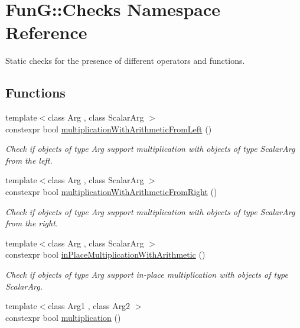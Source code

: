\hypertarget{namespaceFunG_1_1Checks}{}\section{Fun\+G\+:\+:Checks Namespace Reference}
\label{namespaceFunG_1_1Checks}


Static checks for the presence of different operators and functions.  


\subsection*{Functions}
\begin{DoxyCompactItemize}
\item 
{\footnotesize template$<$class Arg , class Scalar\+Arg $>$ }\\constexpr bool \hyperlink{namespaceFunG_1_1Checks_a023e0071a13fe19a14bd71df1a02a290}{multiplication\+With\+Arithmetic\+From\+Left} ()
\begin{DoxyCompactList}\small\item\em Check if objects of type Arg support multiplication with objects of type Scalar\+Arg from the left. \end{DoxyCompactList}\item 
{\footnotesize template$<$class Arg , class Scalar\+Arg $>$ }\\constexpr bool \hyperlink{namespaceFunG_1_1Checks_a584f795b6dfaffd9657888893afd32f3}{multiplication\+With\+Arithmetic\+From\+Right} ()
\begin{DoxyCompactList}\small\item\em Check if objects of type Arg support multiplication with objects of type Scalar\+Arg from the right. \end{DoxyCompactList}\item 
{\footnotesize template$<$class Arg , class Scalar\+Arg $>$ }\\constexpr bool \hyperlink{namespaceFunG_1_1Checks_a3b91969c5e1b84915c384cee63bdb649}{in\+Place\+Multiplication\+With\+Arithmetic} ()
\begin{DoxyCompactList}\small\item\em Check if objects of type Arg support in-\/place multiplication with objects of type Scalar\+Arg. \end{DoxyCompactList}\item 
{\footnotesize template$<$class Arg1 , class Arg2 $>$ }\\constexpr bool \hyperlink{namespaceFunG_1_1Checks_afc0d2ac0287022a297061359d40073d2}{multiplication} ()

\end{DoxyCompactItemize}
